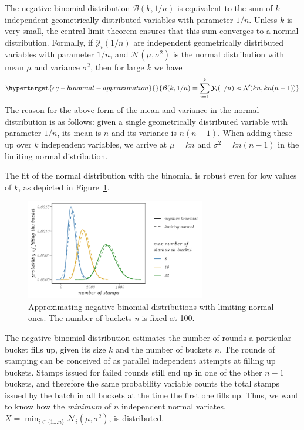 \documentclass[
  letterpaper,
  DIV=11,
  numbers=noendperiod]{scrartcl}
\begin{document}
The negative binomial distribution $\mathcal{B}(k, 1/n)$ is equivalent
to the sum of $k$ independent geometrically distributed variables with
parameter $1/n$. Unless $k$ is very small, the central limit theorem
ensures that this sum converges to a normal distribution. Formally, if
$\mathcal{Y}_i(1/n)$ are independent geometrically distributed
variables with parameter $1/n$, and $\mathcal{N}(\mu, \sigma^2)$ is
the normal distribution with mean $\mu$ and variance $\sigma^2$,
then for large $k$ we have
\begin{equation}\protect\hypertarget{eq-binomial-approximation}{}{
\mathcal{B}(k, 1/n) = \sum_{i=1}^k \mathcal{Y}_i(1/n) \approx \mathcal{N}(kn, kn(n-1))
}\label{eq-binomial-approximation}\end{equation} The reason for the
above form of the mean and variance in the normal distribution is as
follows: given a single geometrically distributed variable with
parameter $1/n$, its mean is $n$ and its variance is $n(n-1)$.
When adding these up over $k$ independent variables, we arrive at
$\mu = k n$ and $\sigma^2 = k n (n - 1)$ in the limiting normal
distribution.

The fit of the normal distribution with the binomial is robust even for
low values of $k$, as depicted in Figure~\ref{fig-normal-binomial}.

\begin{figure}

{\centering \includegraphics[width=0.7\textwidth,height=\textheight]{postage_batch_utilization_figs/fig-normal-binomial-1.pdf}

}

\caption{\label{fig-normal-binomial}Approximating negative binomial
distributions with limiting normal ones. The number of buckets \emph{n}
is fixed at 100.}

\end{figure}

The negative binomial distribution estimates the number of rounds a
particular bucket fills up, given its size $k$ and the number of
buckets $n$. The rounds of stamping can be conceived of as parallel
independent attempts at filling up buckets. Stamps issued for failed
rounds still end up in one of the other $n - 1$ buckets, and therefore
the same probability variable counts the total stamps issued by the
batch in all buckets at the time the first one fills up. Thus, we want
to know how the \emph{minimum} of $n$ independent normal variates,
$X = \min_{i \in \{1\ldots n\}} \mathcal{N}_i(\mu, \sigma^2)$, is
distributed.
\end{document}
